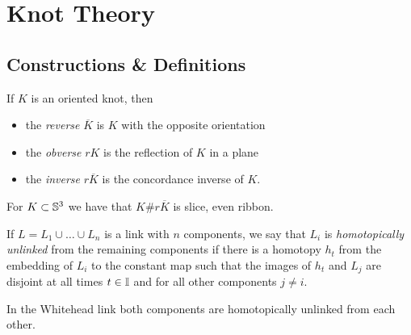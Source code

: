 \chapter{Knot Theory}

\section{Constructions \& Definitions}


\begin{definition}
	If $K$ is an oriented knot, then
	\begin{itemize}
		\item the \textit{reverse} $\overline{K}$
		is $K$ with the opposite orientation
		
		\item the \textit{obverse} $rK$ is
		the reflection of $K$ in a plane
		
		\item the \textit{inverse} $r \overline{K}$
		is the concordance inverse of $K$.
	\end{itemize}
\end{definition}

\begin{proposition}
	For $K \subset \mathbb{S}^{3}$ we have that
	$K \# r \overline{K}$ is slice, even ribbon.
\end{proposition}


\begin{definition}
	If $L = L_{1} \cup \ldots \cup L_{n}$ is a link with $n$
	components, we say that $L_i$ is
	\textit{homotopically unlinked} 
	from the remaining components if there is
	a homotopy $h_{t}$ from the embedding of $L_{i}$ to the constant
	map such that the images of $h_{t}$ and $L_{j}$ are disjoint
	at all times $t \in \mathbb{I}$ and for all other components $j \ne i$.
\end{definition}

\begin{example}
	In the Whitehead link both components are
	homotopically unlinked from each other.
\end{example}

